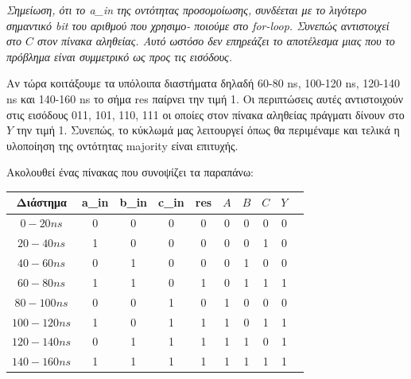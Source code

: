 \documentclass[]{article}
\begin{document}
\textit{Σημείωση, ότι το a\_in της οντότητας προσομοίωσης, συνδέεται με το λιγότερο σημαντικό bit του αριθμού που χρησιμο- ποιούμε στο for-loop.
	Συνεπώς αντιστοιχεί στο $C$ στον πίνακα αληθείας. Αυτό ωστόσο δεν επηρεάζει το αποτέλεσμα μιας που το πρόβλημα είναι συμμετρικό ως προς τις εισόδους.}

Αν τώρα κοιτάξουμε τα υπόλοιπα διαστήματα δηλαδή 60-80 ns, 100-120 ns, 120-140 ns και 140-160 ns το σήμα res παίρνει την τιμή 1.
Οι περιπτώσεις αυτές αντιστοιχούν στις εισόδους 011, 101, 110, 111 οι οποίες στον πίνακα αληθείας πράγματι δίνουν στο $Y$ την τιμή 1.
Συνεπώς, το κύκλωμά μας λειτουργεί όπως θα περιμέναμε και τελικά η υλοποίηση της οντότητας majority είναι επιτυχής.

Ακολουθεί ένας πίνακας που συνοψίζει τα παραπάνω:
\begin{center}
	\begin{tabular}{|c|c|c|c|c|c|c|c|c|c}
		\hline Διάστημα  & a\_in & b\_in & c\_in & res & $A$ & $B$ & $C$ & $Y$ \\
		\hline $0-20 ns$ & 0     & 0     & 0     & 0   & 0   & 0   & 0   & 0   \\
		$20-40 ns$       & 1     & 0     & 0     & 0   & 0   & 0   & 1   & 0   \\
		$40-60 ns$       & 0     & 1     & 0     & 0   & 0   & 1   & 0   & 0   \\
		$60-80 ns$       & 1     & 1     & 0     & 1   & 0   & 1   & 1   & 1   \\
		$80-100 ns$      & 0     & 0     & 1     & 0   & 1   & 0   & 0   & 0   \\
		$100-120 ns$     & 1     & 0     & 1     & 1   & 1   & 0   & 1   & 1   \\
		$120-140 ns$     & 0     & 1     & 1     & 1   & 1   & 1   & 0   & 1   \\
		$140-160 ns$     & 1     & 1     & 1     & 1   & 1   & 1   & 1   & 1   \\
		\hline
	\end{tabular}
\end{center}
\end{document}
